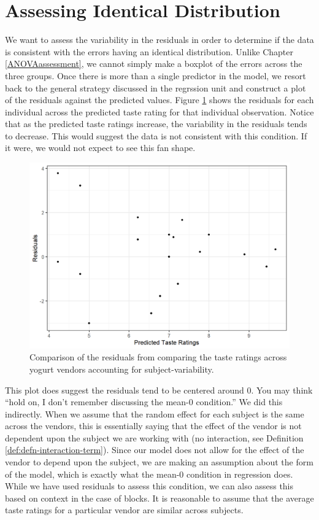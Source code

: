 \documentclass[
]{book}
\theoremstyle{plain}
\theoremstyle{mydefn}
\theoremstyle{myexmpl}
\theoremstyle{remark}
\begin{document}
\hypertarget{assessing-identical-distribution}{%
\section{Assessing Identical Distribution}\label{assessing-identical-distribution}}

We want to assess the variability in the residuals in order to determine if the data is consistent with the errors having an identical distribution. Unlike Chapter \ref{ANOVAassessment}, we cannot simply make a boxplot of the errors across the three groups. Once there is more than a single predictor in the model, we resort back to the general strategy discussed in the regrssion unit and construct a plot of the residuals against the predicted values. Figure \ref{fig:blockassessment-variance-yogurt} shows the residuals for each individual across the predicted taste rating for that individual observation. Notice that as the predicted taste ratings increase, the variability in the residuals tends to decrease. This would suggest the data is not consistent with this condition. If it were, we would not expect to see this fan shape.

\begin{figure}

{\centering \includegraphics[width=0.8\linewidth]{./Images/blockassessment-variance-yogurt-1} 

}

\caption{Comparison of the residuals from comparing the taste ratings across yogurt vendors accounting for subject-variability.}\label{fig:blockassessment-variance-yogurt}
\end{figure}

This plot does suggest the residuals tend to be centered around 0. You may think ``hold on, I don't remember discussing the mean-0 condition.'' We did this indirectly. When we assume that the random effect for each subject is the same across the vendors, this is essentially saying that the effect of the vendor is not dependent upon the subject we are working with (no interaction, see Definition \ref{def:defn-interaction-term}). Since our model does not allow for the effect of the vendor to depend upon the subject, we are making an assumption about the form of the model, which is exactly what the mean-0 condition in regression does. While we have used residuals to assess this condition, we can also assess this based on context in the case of blocks. It is reasonable to assume that the average taste ratings for a particular vendor are similar across subjects.
\end{document}
